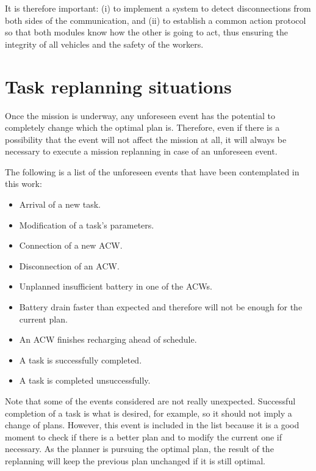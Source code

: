 It is therefore important: (i) to implement a system to detect disconnections from both sides of the communication, and (ii) to establish a common action protocol so that both modules know how the other is going to act, thus ensuring the integrity of all vehicles and the safety of the workers.

\section{Task replanning situations} %
\label{sec:TaskReplanningSituations}
Once the mission is underway, any unforeseen event has the potential to completely change which the optimal plan is. Therefore, even if there is a possibility that the event will not affect the mission at all, it will always be necessary to execute a mission replanning in case of an unforeseen event.

The following is a list of the unforeseen events that have been contemplated in this work:

\begin{itemize}
    \item Arrival of a new task.
    \item Modification of a task's parameters.
    \item Connection of a new \gls{ACW}.
    \item Disconnection of an \gls{ACW}.
    \item Unplanned insufficient battery in one of the \glspl{ACW}.
    \item Battery drain faster than expected and therefore will not be enough for the current plan.
    \item An \gls{ACW} finishes recharging ahead of schedule.
    \item A task is successfully completed.
    \item A task is completed unsuccessfully.
\end{itemize}

Note that some of the events considered are not really unexpected. Successful completion of a task is what is desired, for example, so it should not imply a change of plans. However, this event is included in the list because it is a good moment to check if there is a better plan and to modify the current one if necessary. As the planner is pursuing the optimal plan, the result of the replanning will keep the previous plan unchanged if it is still optimal.